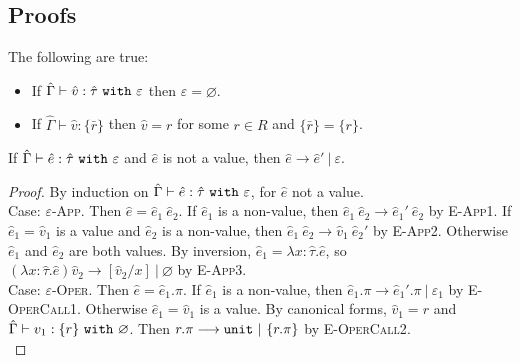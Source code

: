 \begin{appendix}

\chapter{Proofs}\label{appendix:LAS File}
\begin{lemma}
The following are true:
\begin{itemize}
	\setlength\itemsep{-0.7em}
	\item If $\hat \Gamma \vdash \hat v: \hat \tau~\mathtt{with}~ \varepsilon$ then $\varepsilon = \varnothing$.
	\item If $\hat \Gamma \vdash \hat v: \{ \bar r \}$ then $\hat v = r$ for some $r \in R$ and $\{ \bar r \} = \{ r \}$.
\end{itemize}
\end{lemma}

\hrulefill

\begin{theorem}[Progress]
If $\hat \Gamma \vdash \hat e: \hat \tau~\mathtt{with}~ \varepsilon$ and $\hat e$ is not a value, then $\hat e \longrightarrow \hat e'~|~\varepsilon$.
\end{theorem}

\begin{proof} By induction on $\hat \Gamma \vdash \hat e: \hat \tau~\mathtt{with}~ \varepsilon$, for $\hat e$ not a value.\\

Case: \textsc{$\varepsilon$-App}. Then $\hat e = \hat e_1~\hat e_2$. If $\hat e_1$ is a non-value, then $\hat e_1~\hat e_2 \longrightarrow \hat e_1'~\hat e_2$ by \textsc{E-App1}. If $\hat e_1 = \hat v_1$ is a value and $\hat e_2$ is a non-value, then $\hat e_1~\hat e_2 \longrightarrow \hat v_1~\hat e_2'$ by \textsc{E-App2}. Otherwise $\hat e_1$ and $\hat e_2$ are both values. By inversion, $\hat e_1 = \lambda x: \hat \tau . \hat e$, so $(\lambda x: \hat \tau. \hat e) \hat v_2 \longrightarrow [\hat v_2/x]~|~\varnothing$ by \textsc{E-App3}.\\

Case: \textsc{$\varepsilon$-Oper}. Then $\hat e = \hat e_1.\pi$. If $\hat e_1$ is a non-value, then $\hat e_1.\pi \longrightarrow \hat e_1'.\pi~|~\varepsilon_1$ by \textsc{E-OperCall1}. Otherwise $\hat e_1 = \hat v_1$ is a value. By canonical forms, $\hat v_1 = r$ and $\hat \Gamma \vdash v_1: \{ r \}~\mathtt{with}~ \varnothing$. Then $r.\pi \longrightarrow \mathtt{unit}~|~\{ r.\pi \}$ by \textsc{E-OperCall2}.\\


\end{proof}
\end{appendix}
